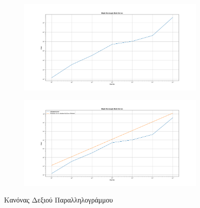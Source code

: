 \documentclass{article}
\begin{document}
\newpage
\begin{figure}[H]
	\begin{adjustbox}{center}
		\begin{subfigure}[c]{.8\textwidth}    
			\includegraphics[width=1\textwidth,height=\textheight,keepaspectratio]{media/1/Figure_3.png}
		\end{subfigure}%

	    \begin{subfigure}[c]{.8\textwidth}    
			\includegraphics[width=1\textwidth,height=\textheight,keepaspectratio]{media/1/Figure_4.png}
		\end{subfigure}%
		
	\end{adjustbox}
\caption{Κανόνας Δεξιού Παραλληλογράμμου}
    \label{(Right_Rectangular_Rule)}
\end{figure}
\end{document}
